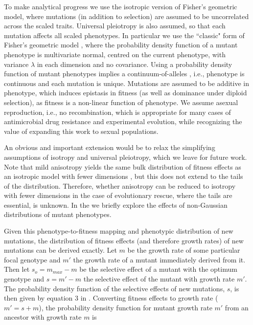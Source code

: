 \documentclass[9pt,twocolumn,twoside,lineno]{gsajnl}
\begin{document}
To make analytical progress we use the isotropic version of Fisher's geometric model, where mutations (in addition to selection) are assumed to be uncorrelated across the scaled traits.
Universal pleiotropy is also assumed, so that each mutation affects all scaled phenotypes.
In particular we use the ``classic" form of Fisher's geometric model \citep{Harmand2017}, where the probability density function of a mutant phenotype is multivariate normal, centred on the current phenotype, with variance $\lambda$ in each dimension and no covariance.
Using a probability density function of mutant phenotypes implies a continuum-of-alleles \citep{Kimura1965}, i.e., phenotype is continuous and each mutation is unique.
Mutations are assumed to be additive in phenotype, which induces epistasis in fitness (as well as dominance under diploid selection), as fitness is a non-linear function of phenotype.
We assume asexual reproduction, i.e., no recombination, which is appropriate for many cases of antimicrobial drug resistance and experimental evolution, while recognizing the value of expanding this work to sexual populations.

An obvious and important extension would be to relax the simplifying assumptions of isotropy and universal pleiotropy, which we leave for future work.
Note that mild anisotropy yields the same bulk distribution of fitness effects as an isotropic model with fewer dimensions \citep{Martin2006}, but this does not extend to the tails of the distribution. 
Therefore, whether anisotropy can be reduced to isotropy with fewer dimensions in the case of evolutionary rescue, where the tails are essential, is unknown.
In the  we briefly explore the effects of non-Gaussian distributions of mutant phenotypes. 

Given this phenotype-to-fitness mapping and phenotypic distribution of new mutations, the distribution of fitness effects (and therefore growth rates) of new mutations can be derived exactly. 
Let $m$ be the growth rate of some particular focal genotype and $m'$ the growth rate of a mutant immediately derived from it.
Then let $s_o = m_{max} - m$ be the selective effect of a mutant with the optimum genotype and $s = m' - m$ the selective effect of the mutant with growth rate $m'$.
The probability density function of the selective effects of new mutations, $s$, is then given by equation 3 in \cite{Martin2015}.
Converting fitness effects to growth rate ($m'=s+m$), the probability density function for mutant growth rate $m'$ from an ancestor with growth rate $m$ is \cite[cf.\ equation 2 in][]{Anciaux2018}
\end{document}
